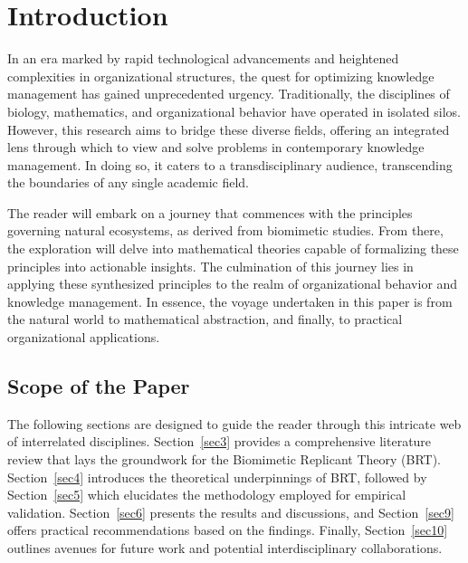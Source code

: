 \documentclass[sn-nature]{sn-jnl}%
\theoremstyle{thmstyleone}%
\theoremstyle{thmstyletwo}%
\theoremstyle{thmstylethree}%
\begin{document}

\clearpage
\tableofcontents
\listoftables
\listoffigures
\clearpage

\section{Introduction}\label{sec1}

In an era marked by rapid technological advancements and heightened complexities in organizational structures, the quest for optimizing knowledge management has gained unprecedented urgency. Traditionally, the disciplines of biology, mathematics, and organizational behavior have operated in isolated silos. However, this research aims to bridge these diverse fields, offering an integrated lens through which to view and solve problems in contemporary knowledge management. In doing so, it caters to a transdisciplinary audience, transcending the boundaries of any single academic field.

The reader will embark on a journey that commences with the principles governing natural ecosystems, as derived from biomimetic studies. From there, the exploration will delve into mathematical theories capable of formalizing these principles into actionable insights. The culmination of this journey lies in applying these synthesized principles to the realm of organizational behavior and knowledge management. In essence, the voyage undertaken in this paper is from the natural world to mathematical abstraction, and finally, to practical organizational applications.

\subsection{Scope of the Paper}\label{sec1.1}

The following sections are designed to guide the reader through this intricate web of interrelated disciplines. Section~\ref{sec3} provides a comprehensive literature review that lays the groundwork for the Biomimetic Replicant Theory (BRT). Section~\ref{sec4} introduces the theoretical underpinnings of BRT, followed by Section~\ref{sec5} which elucidates the methodology employed for empirical validation. Section~\ref{sec6} presents the results and discussions, and Section~\ref{sec9} offers practical recommendations based on the findings. Finally, Section~\ref{sec10} outlines avenues for future work and potential interdisciplinary collaborations.
\end{document}
